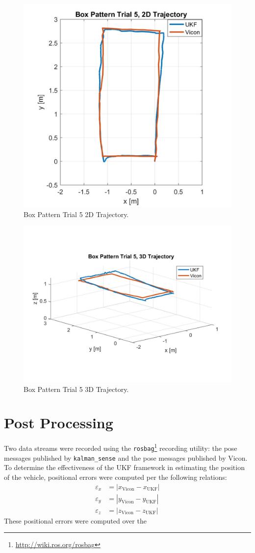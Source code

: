 \begin{figure}[p]
  \centering
    \includegraphics[height=0.6\textwidth]{box5_2d}
  \caption[Box Pattern Trial 5 2D Trajectory]{Box Pattern Trial 5 2D Trajectory.}
  \label{fig:box5_2d}
\end{figure}
\begin{figure}[p]
  \centering
    \includegraphics[height=0.7\textwidth]{box5_3d}
  \caption[Box Pattern Trial 5 3D Trajectory]{Box Pattern Trial 5 3D Trajectory.}
  \label{fig:box5_3d}
\end{figure}
\clearpage

\section{Post Processing}

Two data streams were recorded using the \texttt{rosbag}\footnote{\url{http://wiki.ros.org/rosbag}} recording utility: the pose messages published by \texttt{kalman\_sense} and the pose messages published by Vicon. To determine the effectiveness of the UKF framework in estimating the position of the vehicle, positional errors were computed per the following relations:
%
\begin{align}
\varepsilon_{x} &= | x_{\text{Vicon}} - x_{\text{UKF}} | \\
\varepsilon_{y} &= | y_{\text{Vicon}} - y_{\text{UKF}} | \\
\varepsilon_{z} &= | z_{\text{Vicon}} - z_{\text{UKF}} |
\end{align}
%
These positional errors were computed over the 

